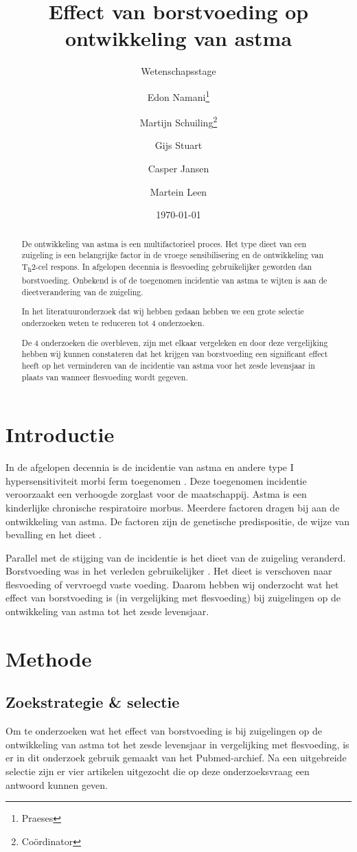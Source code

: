 \documentclass[abstract=true]{scrartcl}
\title{Effect van borstvoeding op ontwikkeling van astma}
\subtitle{Wetenschapsstage}
\author{Edon Namani\thanks{Praeses} \and Martijn Schuiling\thanks{Co\"ordinator} \and Gijs Stuart \and Casper Jansen \and Martein Leen}
\date{\today}
\begin{document}
\maketitle
    \begin{abstract}
        De ontwikkeling van astma is een multifactorieel proces. Het type dieet van een zuigeling is een belangrijke factor in de vroege sensibilisering en de ontwikkeling van T\textsubscript{h}2-cel respons. In afgelopen decennia is flesvoeding gebruikelijker geworden dan borstvoeding. Onbekend is of de toegenomen incidentie van astma te wijten is aan de dieetverandering van de zuigeling.
        
        In het literatuuronderzoek dat wij hebben gedaan hebben we een grote selectie onderzoeken weten te reduceren tot 4 onderzoeken.
        
        De 4 onderzoeken die overbleven, zijn met elkaar vergeleken en door deze vergelijking hebben wij kunnen constateren dat het krijgen van borstvoeding een significant effect heeft op het verminderen van de incidentie van astma voor het zesde levensjaar in plaats van wanneer flesvoeding wordt gegeven. 
    \end{abstract}

\section{Introductie}
In de afgelopen decennia is de incidentie van astma en andere type I hypersensitiviteit morbi ferm toegenomen \cite{Platts_Mills_2015}. Deze toegenomen incidentie veroorzaakt een verhoogde zorglast voor de maatschappij. Astma is een kinderlijke chronische respiratoire morbus. Meerdere factoren dragen bij aan de ontwikkeling van astma. De factoren zijn de genetische predispositie, de wijze van bevalling en het dieet \cite{abbas2017cellular,Houghteling_2015}.

Parallel met de stijging van de incidentie is het dieet van de zuigeling veranderd. Borstvoeding was in het verleden gebruikelijker \cite{world1981contemporary,Victora_2016,Rollins_2016}. Het dieet is verschoven naar flesvoeding of vervroegd vaste voeding. Daarom hebben wij onderzocht wat het effect van borstvoeding is (in vergelijking met flesvoeding) bij zuigelingen op de ontwikkeling van astma tot het zesde levensjaar.


\section{Methode}
    \subsection{Zoekstrategie \& selectie}
    Om te onderzoeken wat het effect van borstvoeding is bij zuigelingen op de ontwikkeling van astma tot het zesde levensjaar in vergelijking met flesvoeding, is er in dit onderzoek gebruik gemaakt van het Pubmed-archief. Na een uitgebreide selectie zijn er vier artikelen uitgezocht die op deze onderzoeksvraag een antwoord kunnen geven.\hfil
\end{document}
